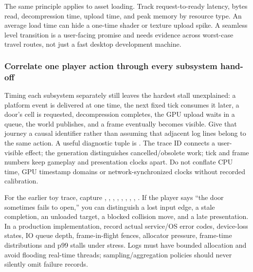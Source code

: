 The same principle applies to asset loading. Track request-to-ready latency, bytes read, decompression time, upload time, and peak memory by resource type. An average load time can hide a one-time shader or texture upload spike. A seamless level transition is a user-facing promise and needs evidence across worst-case travel routes, not just a fast desktop development machine.

\subsubsection{Correlate one player action through every subsystem hand-off}\label{06-engine-ii-ch041-correlate-one-player-action-through-every-subsystem-hand-off}

\hypertarget{06-engine-ii-ch041-correlate-one-player-action-through-every-subsystem-hand-off}{}

Timing each subsystem separately still leaves the hardest stall unexplained: a platform event is delivered at one time, the next fixed tick consumes it later, a door's cell is requested, decompression completes, the GPU upload waits in a queue, the world publishes, and a frame eventually becomes visible. Give that journey a causal identifier rather than assuming that adjacent log lines belong to the same action. A useful diagnostic tuple is . The trace ID connects a user-visible effect; the generation distinguishes cancelled/obsolete work; tick and frame numbers keep gameplay and presentation clocks apart. Do not conflate CPU time, GPU timestamp domains or network-synchronized clocks without recorded calibration.

For the earlier toy trace, capture , , , , , , , , . If the player says ``the door sometimes fails to open,'' you can distinguish a lost input edge, a stale completion, an unloaded target, a blocked collision move, and a late presentation. In a production implementation, record actual service/OS error codes, device-loss states, IO queue depth, frame-in-flight fences, allocator pressure, frame-time distributions and p99 stalls under stress. Logs must have bounded allocation and avoid flooding real-time threads; sampling/aggregation policies should never silently omit failure records.

